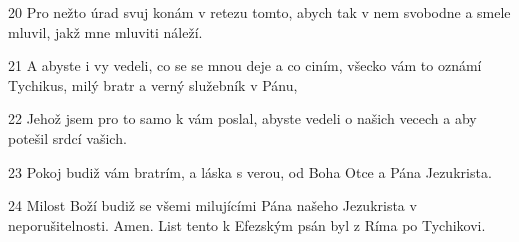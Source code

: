 \par 20 Pro nežto úrad svuj konám v retezu tomto, abych tak v nem svobodne a smele mluvil, jakž mne mluviti náleží.
\par 21 A abyste i vy vedeli, co se se mnou deje a co ciním, všecko vám to oznámí Tychikus, milý bratr a verný služebník v Pánu,
\par 22 Jehož jsem pro to samo k vám poslal, abyste vedeli o našich vecech a aby potešil srdcí vašich.
\par 23 Pokoj budiž vám bratrím, a láska s verou, od Boha Otce a Pána Jezukrista.
\par 24 Milost Boží budiž se všemi milujícími Pána našeho Jezukrista v neporušitelnosti. Amen. List tento k Efezským psán byl z Ríma po Tychikovi.


